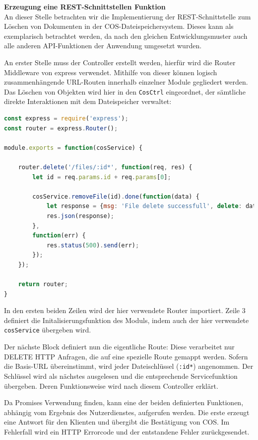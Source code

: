 \textbf{Erzeugung eine REST-Schnittstellen Funktion}\\
An dieser Stelle betrachten wir die Implementierung der REST-Schnittstelle zum Löschen von Dokumenten in der \ac{COS}-Dateispeichersystem. Dieses kann als exemplarisch betrachtet werden, da nach den gleichen Entwicklungsmuster auch alle anderen API-Funktionen der Anwendung umgesetzt wurden. 

An erster Stelle muss der Controller erstellt werden, hierfür wird die Router Middleware von express verwendet. Mithilfe von dieser können logisch zusammenhängende URL-Routen innerhalb einzelner Module gegliedert werden. Das Löschen von Objekten wird hier in den \lstinline|CosCtrl| eingeordnet, der sämtliche direkte Interaktionen mit dem Dateispeicher verwaltet:\\

\begin{lstlisting}[language=JavaScript, caption=CosCtrl.js mit einer Route zur Dateilöschung]
const express = require('express');
const router = express.Router();

module.exports = function(cosService) {

	router.delete('/files/:id*', function(req, res) {
		let id = req.params.id + req.params[0];

		cosService.removeFile(id).done(function(data) {
			let response = {msg: 'File delete successfull', delete: data};
			res.json(response);
		},
		function(err) {
			res.status(500).send(err);
		});
	});

	return router;
}
\end{lstlisting}

In den ersten beiden Zeilen wird der hier verwendete Router importiert. Zeile 3 definiert die Initalisierungsfunktion des Moduls, indem auch der hier verwendete \lstinline|cosService| übergeben wird.

Der nächste Block definiert nun die eigentliche Route: Diese verarbeitet nur DELETE HTTP Anfragen, die auf eine spezielle Route gemappt werden. Sofern die Basis-URL übereinstimmt, wird jeder Dateischlüssel (\lstinline|:id*|) angenommen. Der Schlüssel wird als nächstes ausgelesen und die entsprechende Servicefunktion übergeben. Deren Funktionsweise wird nach diesem Controller erklärt.

Da \gls{Promise}s Verwendung finden, kann eine der beiden definierten Funktionen, abhängig vom Ergebnis des Nutzerdienstes, aufgerufen werden. Die erste erzeugt eine Antwort für den Klienten und übergibt die Bestätigung von \ac{COS}. Im Fehlerfall wird ein HTTP Errorcode und der entstandene Fehler zurückgesendet.

